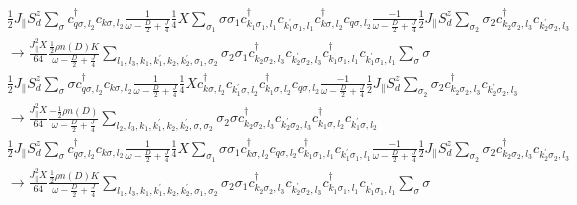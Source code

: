 \documentclass[12pt]{revtex4-2}
\begin{document}
\begin{equation}\begin{aligned}
	&\frac{1}{2}J_\parallel S_d^z \sum_\sigma c^\dagger_{q \sigma, l_2}c_{k \sigma, l_2} \frac{1}{\omega - \frac{D}{2} + \frac{J}{4}} \frac{1}{4}X \sum_{\sigma_1}\sigma \sigma_1 c^\dagger_{k_1\sigma_1,l_1}c_{k_1^\prime\sigma_1,l_1}c^\dagger_{k\sigma,l_2}c_{q\sigma,l_2}\frac{-1}{\omega - \frac{D}{2} + \frac{J}{4}}\frac{1}{2}J_\parallel S_d^z \sum_{\sigma_2} \sigma_2 c^\dagger_{k_2 \sigma_2, l_3}c_{k_2^\prime \sigma_2, l_3} \\
	&\longrightarrow \frac{J_\parallel^2 X}{64} \frac{\frac{1}{2}\rho n(D) K}{\omega - \frac{D}{2} + \frac{J}{4}}\sum_{l_1, l_3, k_1,k_1^\prime,k_2,k_2^\prime,\sigma_1,\sigma_2} \sigma_2 \sigma_1 c^\dagger_{k_2 \sigma_2, l_3}c_{k_2^\prime \sigma_2, l_3} c^\dagger_{k_1\sigma_1,l_1}c_{k_1^\prime\sigma_1,l_1}\sum_\sigma\sigma
\end{aligned}\end{equation}
\begin{equation}\begin{aligned}
	&\frac{1}{2}J_\parallel S_d^z \sum_\sigma \sigma c^\dagger_{q \sigma, l_2}c_{k \sigma, l_2} \frac{1}{\omega - \frac{D}{2} + \frac{J}{4}} \frac{1}{4}X c^\dagger_{k\sigma,l_2}c_{k_1^\prime\sigma,l_2}c^\dagger_{k_1\sigma,l_2}c_{q\sigma,l_2}\frac{-1}{\omega - \frac{D}{2} + \frac{J}{4}}\frac{1}{2}J_\parallel S_d^z \sum_{\sigma_2} \sigma_2 c^\dagger_{k_2 \sigma_2, l_3}c_{k_2^\prime \sigma_2, l_3} \\
	&\longrightarrow \frac{J_\parallel^2 X}{64} \frac{-\frac{1}{2}\rho n(D)}{\omega - \frac{D}{2} + \frac{J}{4}}\sum_{l_2, l_3, k_1,k_1^\prime,k_2,k_2^\prime,\sigma,\sigma_2} \sigma_2 \sigma c^\dagger_{k_2 \sigma_2, l_3}c_{k_2^\prime \sigma_2, l_3} c^\dagger_{k_1\sigma,l_2}c_{k_1^\prime\sigma,l_2}
\end{aligned}\end{equation}
\begin{equation}\begin{aligned}
	&\frac{1}{2}J_\parallel S_d^z \sum_\sigma c^\dagger_{q \sigma, l_2}c_{k \sigma, l_2} \frac{1}{\omega - \frac{D}{2} + \frac{J}{4}} \frac{1}{4}X \sum_{\sigma_1}\sigma \sigma_1 c^\dagger_{k\sigma,l_2}c_{q\sigma,l_2} c^\dagger_{k_1\sigma_1,l_1}c_{k_1^\prime\sigma_1,l_1}\frac{-1}{\omega - \frac{D}{2} + \frac{J}{4}}\frac{1}{2}J_\parallel S_d^z \sum_{\sigma_2} \sigma_2 c^\dagger_{k_2 \sigma_2, l_3}c_{k_2^\prime \sigma_2, l_3}\\
	&\longrightarrow \frac{J_\parallel^2 X}{64} \frac{\frac{1}{2}\rho n(D) K}{\omega - \frac{D}{2} + \frac{J}{4}}\sum_{l_1, l_3, k_1,k_1^\prime,k_2,k_2^\prime,\sigma_1,\sigma_2} \sigma_2 \sigma_1 c^\dagger_{k_2 \sigma_2, l_3}c_{k_2^\prime \sigma_2, l_3} c^\dagger_{k_1\sigma_1,l_1}c_{k_1^\prime\sigma_1,l_1}\sum_\sigma\sigma
\end{aligned}\end{equation}
\end{document}
